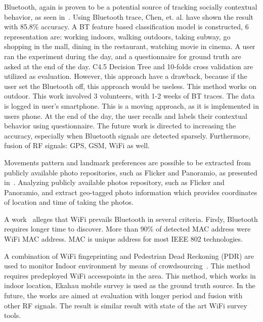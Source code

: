 Bluetooth, again is proven to be a potential source of tracking socially contextual behavior, as seen in~\cite{thesis028}. Using Bluetooth trace, Chen, et. al. have shown the result with 85.8\% accuracy.
A BT feature based classification model is constructed, 6 representation are: working indoors, walking outdoors, taking subway, go shopping in the mall, dining in the restaurant, watching movie in cinema. A user ran the experiment during the day, and a questionnaire for ground truth are asked at the end of the day.
C4.5 Decision Tree and 10-folds cross validation are utilized as evaluation.
However, this approach have a drawback, because if the user set the Bluetooth  off, this approach would be useless.
This method works on outdoor.
This work involved 3 volunteers, with 1-2 weeks of BT traces.
The data is logged in user's smartphone.
This is a moving approach, as it is implemented in users phone.
At the end of the day, the user recalls and labels their contextual behavior using questionnaire.
The future work is directed to increasing the accuracy, especially when Bluetooth signals are detected sparsely. Furthermore, fusion of RF signals: GPS, GSM, WiFi as well.

Movements pattern and landmark preferences are possible to be extracted from publicly available photo repositories, such as Flicker and Panoramio, as presented in~\cite{thesis026}. Analyzing publicly available photos repository, such as Flicker and Panoramio, and extract geo-tagged photo information which provides coordinates of location and time of taking the photos.

A work~\cite{thesis009} alleges that WiFi prevails Bluetooth in several criteria. Firsly, Bluetooth requires longer time to discover. More than 90\% of detected MAC address were WiFi MAC address. MAC is unique address for most IEEE 802 technologies.


A combination of WiFi fingeprinting and Pedestrian Dead Reckoning (PDR) are used to monitor Indoor environment by means of crowdsourcing~\cite{thesis020}. This method requires predeployed WiFi accesspoints in the area. This method, which works in indoor location, Ekahau mobile survey is used as the ground truth source. In the future, the works are aimed at evaluation with longer period and fusion with other RF signals. The result is similar result with state of the art WiFi survey tools.

